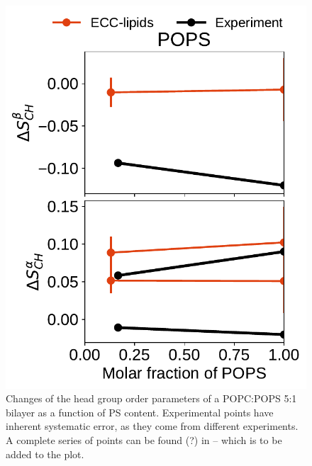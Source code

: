 \begin{figure}[htb!]
  \includegraphics[width=\figwidth]{../img/ecc_pops/order_parameters_changes_A-B_PC-PS_mix_POPS_nacl.pdf} 
  \caption{\label{fig:delta_ordPar_NaCl_PC-PS_mix} 
    Changes of the head group order parameters of a POPC:POPS 5:1 bilayer as a function of PS content.
    Experimental points have inherent systematic error, as they come from different experiments.
    A complete series of points can be found (?) in \cite{roux90} -- which is to be added to the plot.
  } 
\end{figure} 
 
